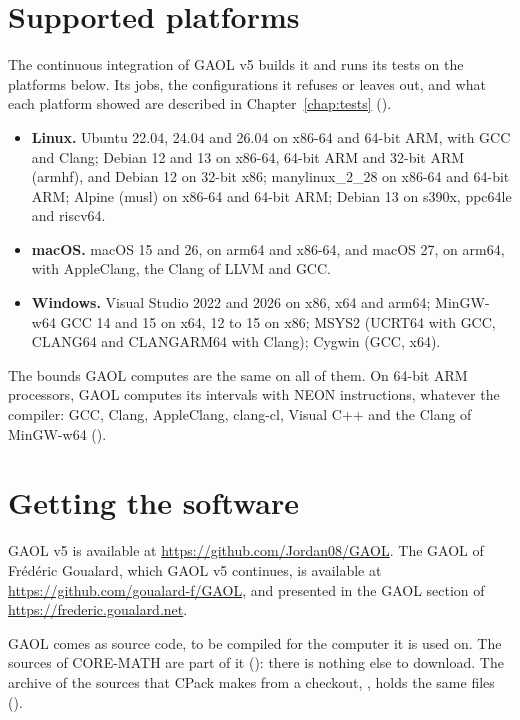 \documentclass[12pt,a4paper,twoside,openright]{book}
\begin{document}
\section{Supported platforms}\label{sec:platforms}
%

The continuous integration of GAOL v5 builds it and runs its tests on the
platforms below. Its jobs, the configurations it refuses or leaves out, and
what each platform showed are described in Chapter~\ref{chap:tests}
().

\begin{itemize}
\item[$\bullet$] \textbf{Linux.} Ubuntu 22.04, 24.04 and 26.04 on x86-64 and
  64-bit ARM, with GCC and Clang; Debian 12 and 13 on x86-64, 64-bit ARM and
  32-bit ARM (armhf), and Debian 12 on 32-bit x86; manylinux\_2\_28 on x86-64
  and 64-bit ARM; Alpine (musl) on x86-64 and 64-bit ARM; Debian 13 on s390x,
  ppc64le and riscv64.
\item[$\bullet$] \textbf{macOS.} macOS 15 and 26, on arm64 and x86-64, and
  macOS 27, on arm64, with AppleClang, the Clang of LLVM and GCC.
\item[$\bullet$] \textbf{Windows.} Visual Studio 2022 and 2026 on x86, x64 and
  arm64; MinGW-w64 GCC 14 and 15 on x64, 12 to 15 on x86; MSYS2 (UCRT64 with
  GCC, CLANG64 and CLANGARM64 with Clang); Cygwin (GCC, x64).
\end{itemize}

\noindent
The bounds GAOL computes are the same on all of them. On 64-bit ARM
processors, GAOL computes its intervals with NEON instructions, whatever the
compiler: GCC, Clang, AppleClang, clang-cl, Visual C++ and the Clang of
MinGW-w64 ().\newinvfive

\section{Getting the software}
%

GAOL v5 is available at \url{https://github.com/Jordan08/GAOL}. The GAOL of
Fr\'ed\'eric Goualard, which GAOL v5 continues, is available at
\url{https://github.com/goualard-f/GAOL}, and presented in the GAOL section of
\url{https://frederic.goualard.net}.

GAOL comes as source code, to be compiled for the computer it is used on. The
sources of CORE-MATH are part of it (): there is nothing
else to download. The archive of the sources that CPack makes from a checkout,
, holds the same files
().
\end{document}
